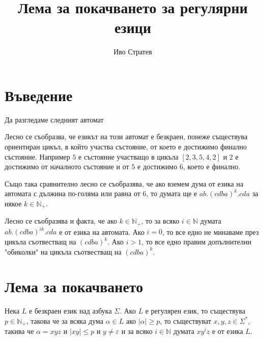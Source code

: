 \documentclass[12pt]{article}
\title{Лема за покачването за регулярни езици}
\author{Иво Стратев}
\begin{document}
\maketitle

\section{Въведение}

Да разгледаме следният автомат

\begin{center}
\end{center}

Лесно се съобразва, че езикът на този автомат е безкраен, понеже съществува ориентиран цикъл, в който участва състояние, от което е достижимо финално състояние. Например \(5\) е състояние участващо в цикъла \([2, 3, 5, 4, 2]\) и \(2\) е достижимо от началното състояние и от \(5\) е достижимо \(6\), което е финално.

Също така сравнително лесно се съобразява, че ако вземем дума от езика на автомата с дължина по-голяма или равна от \(6\),
то думата ще е \(ab . (cdba)^k . cda\) за някое \(k \in \mathbb{N}_+\).

Лесно се съобразява и факта, че ако \(k \in \mathbb{N}_+\), то за всяко \(i \in \mathbb N\) думата  \(ab . (cdba)^{ik} . cda\) е от езика на автомата. Ако \(i = 0\), то все едно не минаваме през цикъла съотвестващ на \((cdba)^k\). Ако \(i > 1\), то все едно правим допълнителни "обиколки" на цикъла съотвестващ на \((cdba)^k\).

\section{Лема за покачването}
Нека \(L\) е безкраен език над азбука \(\Sigma\). Ако \(L\) е регулярен език, то съществува \(p \in \mathbb{N}_+\), такова че 
за всяка дума \(\alpha \in L\) ако \(|\alpha| \geq p\), то съществуват \(x, y, z \in \Sigma^*\), такива че
\(\alpha = xyz\) и \(|xy| \leq p\) и \(y \neq \varepsilon\) и за всяко \(i \in \mathbb N\) думата \(xy^iz\) е от езика \(L\).
\end{document}
